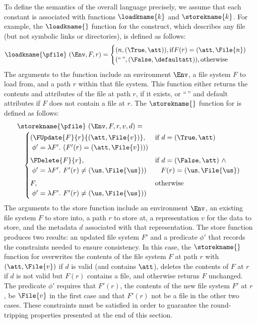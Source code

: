 To define the semantics of the overall language precisely,
we assume that each constant is associated with functions
$\loadkname{k}$ and $\storekname{k}$. For example, the $\loadkname{}$
function for the \pfile{} construct, which describes any file (but not
symbolic links or directories), is defined as follows:
%
\[
\loadkname{\pfile}~(\Env,F,r) =
\begin{cases}
  (n,(\True,\att)), \mathrm{if } F(r) = (\att,\File{n}) \\
  (\text{``}{\,}\text{''},(\False,\defaultatt)), \mathrm{otherwise}\\
\end{cases}
\]
%
The arguments to the function include an environment $\Env$, a file system $F$
to load from, and a path $r$ within that file system.
This function either returns the contents and attributes of the file at path $r$,
if it exists, or ``$\,$'' and default attributes if $F$ does not contain a
file at $r$.  The $\storekname{}$ function for \pfile{} is
defined as follows:
%
\[
\begin{array}{l}
\storekname{\pfile}~(\Env,F,r,v,d) =\\[.5ex]
\quad 
\begin{cases}
  (\FUpdate{F}{r}{(\att,\File{v})},            & \text{if}~d = (\True,\att)\\
   \; \phi' = \lambda F'.~ (F'(r) = (\att,\File{v})))\\[1ex]
  \FDelete{F}{r},                              & \text{if}~d = (\False,\att)~\wedge\\
   \; \phi' = \lambda F'.~ F'(r) \neq (\us,\File{\us})) & \;\;\; F(r) = (\us,\File{\us})\\[1ex]
  F,              & \text{otherwise}\\
   \; \phi' = \lambda F'.~ F'(r) \neq (\us,\File{\us}))\\
\end{cases}
\end{array}
\]
%
The arguments to the store function include an environment $\Env$, an
existing file system $F$ to store into, a path $r$ to store at, a
representation $v$ for the data to store, and the metadata $d$ associated
with that representation.  The store function
produces two results: an updated file system $F'$ and a predicate
$\phi'$ that records the constraints needed to ensure
consistency. In this case, the $\storekname{}$ function for \pfile{}
overwrites the contents of the file system $F$ at path $r$ with
$(\att,\File{v})$ if $d$ is valid (and contains $\att$), deletes the
contents of $F$ at $r$ if $d$ is not valid but $F(r)$ contains a file,
and otherwise returns $F$ unchanged. The predicate $\phi'$ requires
that $F'(r)$, the contents of the new file system $F'$ at $r$, be
$\File{v}$ in the first case and that $F'(r)$ not be a file in the other
two cases. These constraints must be satisfied in order to guarantee
the round-tripping properties presented at the end of this section.

